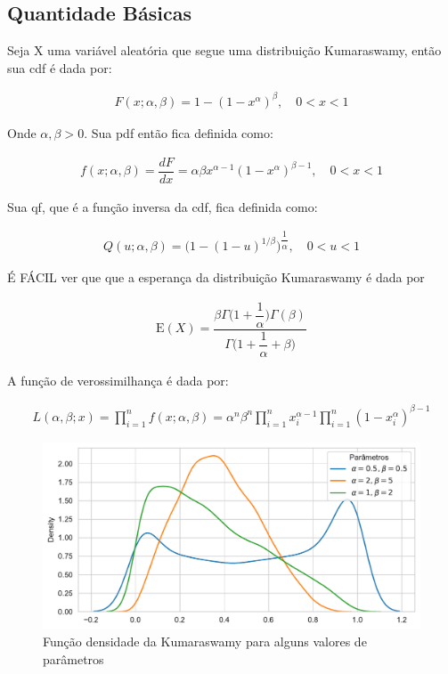 \documentclass[
]{article}
\begin{document}
\subsection{Quantidade Básicas}

Seja X uma variável aleatória que segue uma distribuição Kumaraswamy,
então sua cdf é dada por:

\begin{align}
F(x;\alpha, \beta) = 1 - (1 - x^\alpha)^\beta,  \quad 0 < x< 1
\end{align}

Onde \(\alpha, \beta > 0\). Sua pdf então fica definida como:

\begin{align}
f(x;\alpha, \beta) = \dfrac{dF}{dx} =\alpha\beta x^{\alpha - 1}(1 - x^\alpha)^{\beta  - 1}, \quad 0 < x< 1
\end{align}

Sua qf, que é a função inversa da cdf, fica definida como:

\begin{align}
Q(u;\alpha, \beta) = \bigg(1 - (1 - u)^{1/\beta}\bigg)^{\dfrac{1}{\alpha}}, \quad 0<u<1
\end{align}

É FÁCIL ver que que a esperança da distribuição Kumaraswamy é dada por

\begin{align}
\text{E}(X) = \dfrac{\beta\Gamma\bigg(1 + \dfrac{1}{\alpha}\bigg)\Gamma(\beta)}{\Gamma\bigg(1 + \dfrac{1}{\alpha} + \beta\bigg)}
\end{align}

A função de verossimilhança é dada por:

\begin{align}
L(\alpha, \beta; x) = \prod_{i=1}^{n}f(x;\alpha, \beta) = \alpha^n \beta^n \prod_{i=1}^{n}x_i^{\alpha - 1}\prod_{i=1}^{n}(1-x_i^{\alpha})^{\beta-1}
\end{align}

\begin{figure}

{\centering \includegraphics{report_files/figure-pdf/fig-plt-output-1.pdf}

}

\caption{\label{fig-plt}Função densidade da Kumaraswamy para alguns
valores de parâmetros}

\end{figure}
\end{document}
